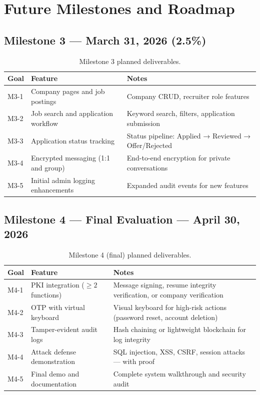 
\section{Future Milestones and Roadmap}
\label{sec:roadmap}

\subsection{Milestone 3 — March 31, 2026 (2.5\%)}

\begin{table}[H]
\centering
\begin{tabular}{p{1.5cm} p{5cm} p{6.5cm}}
    \toprule
    \textbf{Goal} & \textbf{Feature} & \textbf{Notes} \\
    \midrule
    M3-1 & Company pages and job postings & Company CRUD, recruiter role features \\
    M3-2 & Job search and application workflow & Keyword search, filters, application submission \\
    M3-3 & Application status tracking & Status pipeline: Applied → Reviewed → Offer/Rejected \\
    M3-4 & Encrypted messaging (1:1 and group) & End-to-end encryption for private conversations \\
    M3-5 & Initial admin logging enhancements & Expanded audit events for new features \\
    \bottomrule
\end{tabular}
\caption{Milestone 3 planned deliverables.}
\end{table}

\subsection{Milestone 4 — Final Evaluation — April 30, 2026}

\begin{table}[H]
\centering
\begin{tabular}{p{1.5cm} p{5cm} p{6.5cm}}
    \toprule
    \textbf{Goal} & \textbf{Feature} & \textbf{Notes} \\
    \midrule
    M4-1 & PKI integration ($\geq 2$ functions) & Message signing, resume integrity verification, or company verification \\
    M4-2 & OTP with virtual keyboard & Visual keyboard for high-risk actions (password reset, account deletion) \\
    M4-3 & Tamper-evident audit logs & Hash chaining or lightweight blockchain for log integrity \\
    M4-4 & Attack defense demonstration & SQL injection, XSS, CSRF, session attacks — with proof \\
    M4-5 & Final demo and documentation & Complete system walkthrough and security audit \\
    \bottomrule
\end{tabular}
\caption{Milestone 4 (final) planned deliverables.}
\end{table}

